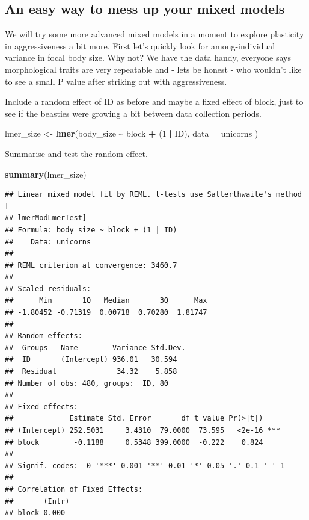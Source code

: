 \documentclass[
  12pt,
]{book}
\newenvironment{Shaded}{\begin{snugshade}}{\end{snugshade}}
\newcommand{\DataTypeTok}[1]{\textcolor[rgb]{0.13,0.29,0.53}{#1}}
\newcommand{\DecValTok}[1]{\textcolor[rgb]{0.00,0.00,0.81}{#1}}
\newcommand{\KeywordTok}[1]{\textcolor[rgb]{0.13,0.29,0.53}{\textbf{#1}}}
\newcommand{\NormalTok}[1]{#1}
\newcommand{\OperatorTok}[1]{\textcolor[rgb]{0.81,0.36,0.00}{\textbf{#1}}}
\newcommand{\StringTok}[1]{\textcolor[rgb]{0.31,0.60,0.02}{#1}}
\begin{document}
\hypertarget{an-easy-way-to-mess-up-your-mixed-models}{%
\subsection{An easy way to mess up your mixed models}\label{an-easy-way-to-mess-up-your-mixed-models}}

We will try some more advanced mixed models in a moment to explore plasticity in aggressiveness a bit more. First let's quickly look for among-individual variance in focal body size. Why not? We have the data handy, everyone says morphological traits are very repeatable and - lets be honest - who wouldn't like to see a small P value after striking out with aggressiveness.

Include a random effect of ID as before and maybe a fixed effect of block, just to see if the beasties were growing a bit between data collection periods.

\begin{Shaded}
\begin{Highlighting}[]
\NormalTok{lmer\_size \textless{}{-}}\StringTok{ }\KeywordTok{lmer}\NormalTok{(body\_size }\OperatorTok{\textasciitilde{}}\StringTok{ }\NormalTok{block }\OperatorTok{+}\StringTok{ }\NormalTok{(}\DecValTok{1} \OperatorTok{|}\StringTok{ }\NormalTok{ID),}
  \DataTypeTok{data =}\NormalTok{ unicorns}
\NormalTok{)}
\end{Highlighting}
\end{Shaded}

Summarise and test the random effect.

\begin{Shaded}
\begin{Highlighting}[]
\KeywordTok{summary}\NormalTok{(lmer\_size)}
\end{Highlighting}
\end{Shaded}

\begin{verbatim}
## Linear mixed model fit by REML. t-tests use Satterthwaite's method [
## lmerModLmerTest]
## Formula: body_size ~ block + (1 | ID)
##    Data: unicorns
## 
## REML criterion at convergence: 3460.7
## 
## Scaled residuals: 
##      Min       1Q   Median       3Q      Max 
## -1.80452 -0.71319  0.00718  0.70280  1.81747 
## 
## Random effects:
##  Groups   Name        Variance Std.Dev.
##  ID       (Intercept) 936.01   30.594  
##  Residual              34.32    5.858  
## Number of obs: 480, groups:  ID, 80
## 
## Fixed effects:
##             Estimate Std. Error       df t value Pr(>|t|)    
## (Intercept) 252.5031     3.4310  79.0000  73.595   <2e-16 ***
## block        -0.1188     0.5348 399.0000  -0.222    0.824    
## ---
## Signif. codes:  0 '***' 0.001 '**' 0.01 '*' 0.05 '.' 0.1 ' ' 1
## 
## Correlation of Fixed Effects:
##       (Intr)
## block 0.000
\end{verbatim}
\end{document}
